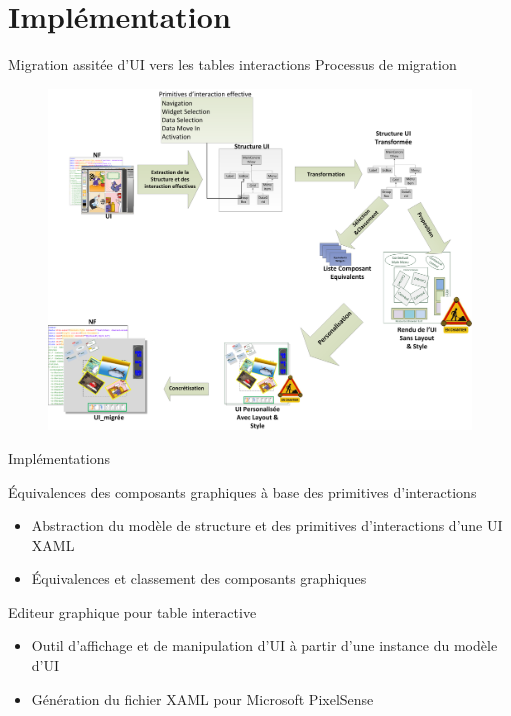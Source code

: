 \documentclass[11pt]{beamer}
\begin{document}
\section{Implémentation}

\begin{frame}{Migration assitée d'UI vers les tables interactions}
{Processus de migration}
\begin{figure}[t]
\begin{center}
\includegraphics[scale=.12]{./img/process}

\end{center}\end{figure}

\end{frame}
\begin{frame}{Implémentations }
\begin{block}{Équivalences des composants graphiques à base des primitives d'interactions}
	\begin{itemize}
		\item Abstraction du modèle de structure et des primitives d'interactions d'une UI XAML 
		\item Équivalences et classement des composants graphiques
	\end{itemize}
\end{block}

\begin{block}{Editeur graphique pour table interactive}
\begin{itemize}
\item Outil d'affichage et de manipulation d'UI à partir d'une instance du modèle d'UI
\item Génération du fichier XAML pour Microsoft PixelSense
\end{itemize}
\end{block}


\end{frame}
\end{document}
